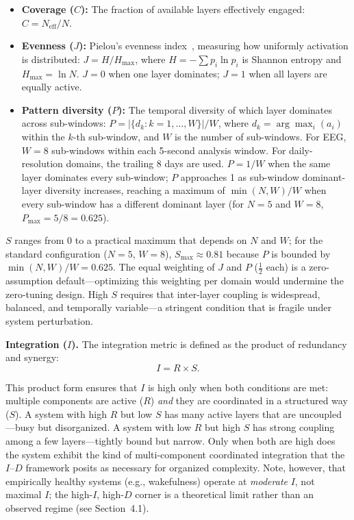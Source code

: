 \documentclass[aip,cha,reprint,amsmath,amssymb,final,floatfix]{revtex4-2}
\begin{document}
\begin{itemize}
\item \textbf{Coverage ($C$):} The fraction of available layers effectively engaged: $C = N_{\text{eff}} / N$.

\item \textbf{Evenness ($J$):} Pielou's evenness index~\cite{pielou1966}, measuring how uniformly activation is distributed: $J = H / H_{\max}$, where $H = -\sum p_i \ln p_i$ is Shannon entropy and $H_{\max} = \ln N$. $J = 0$ when one layer dominates; $J = 1$ when all layers are equally active.

\item \textbf{Pattern diversity ($P$):} The temporal diversity of which layer dominates across sub-windows: $P = |\{d_k : k = 1, \ldots, W\}| / W$, where $d_k = \arg\max_i(a_i)$ within the $k$-th sub-window, and $W$ is the number of sub-windows. For EEG, $W = 8$ sub-windows within each 5-second analysis window. For daily-resolution domains, the trailing 8 days are used. $P = 1/W$ when the same layer dominates every sub-window; $P$ approaches 1 as sub-window dominant-layer diversity increases, reaching a maximum of $\min(N, W)/W$ when every sub-window has a different dominant layer (for $N = 5$ and $W = 8$, $P_{\max} = 5/8 = 0.625$).
\end{itemize}

$S$ ranges from 0 to a practical maximum that depends on $N$ and $W$; for the standard configuration ($N = 5$, $W = 8$), $S_{\max} \approx 0.81$ because $P$ is bounded by $\min(N, W)/W = 0.625$. The equal weighting of $J$ and $P$ ($\frac{1}{2}$ each) is a zero-assumption default---optimizing this weighting per domain would undermine the zero-tuning design. High $S$ requires that inter-layer coupling is widespread, balanced, and temporally variable---a stringent condition that is fragile under system perturbation.

\textbf{Integration ($I$).} The integration metric is defined as the product of redundancy and synergy:
\begin{equation}
I = R \times S.
\end{equation}

This product form ensures that $I$ is high only when both conditions are met: multiple components are active ($R$) \emph{and} they are coordinated in a structured way ($S$). A system with high $R$ but low $S$ has many active layers that are uncoupled---busy but disorganized. A system with low $R$ but high $S$ has strong coupling among a few layers---tightly bound but narrow. Only when both are high does the system exhibit the kind of multi-component coordinated integration that the $I$--$D$ framework posits as necessary for organized complexity. Note, however, that empirically healthy systems (e.g., wakefulness) operate at \emph{moderate} $I$, not maximal $I$; the high-$I$, high-$D$ corner is a theoretical limit rather than an observed regime (see Section~4.1).
\end{document}

